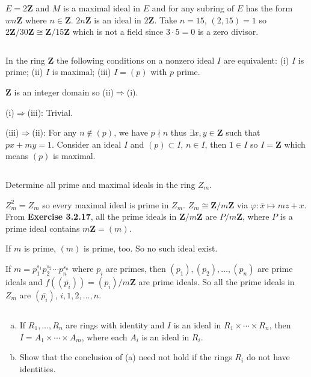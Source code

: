 \begin{answer}
    $E=2\mathbf{Z}$ and $M$ is a maximal ideal in $E$ and for any subring of $E$ has the form $wn\mathbf{Z}$ where $n\in \mathbf{Z}$. $2n\mathbf{Z}$ is an ideal in $2\mathbf{Z}$. Take $n=15$, $(2,15)=1$ so $2\mathbf{Z} /30\mathbf{Z}\cong \mathbf{Z} /15\mathbf{Z}$ which is not a field since $3\cdot 5=0$ is a zero divisor.
\end{answer}

$$ $$

\begin{ex}
    In the ring $\mathbf{Z}$ the following conditions on a nonzero ideal $I$ are equivalent: (i) $I$ is prime; (ii) $I$ is maximal; (iii) $I=(p)$ with $p$ prime.    
\end{ex}

\begin{answer}
    $\mathbf{Z}$ is an integer domain so (ii)$\Rightarrow$(i).

    (i)$\Rightarrow$(iii): Trivial.

    (iii)$\Rightarrow$(ii): For any $n\notin (p)$, we have $p\nmid n$ thus $\exists x,y\in \mathbf{Z}$ such that $px+my=1$. Consider an ideal $I$ and $(p)\subset I$, $n\in I$, then $1\in I$ so $I=\mathbf{Z}$ which means $(p)$ is maximal.
\end{answer}

$$ $$

\begin{ex}
    Determine all prime and maximal ideals in the ring $Z_{m}$.
\end{ex}

\begin{answer}
    $Z_{m}^{2}=Z_{m}$ so every maximal ideal is prime in $Z_{m}$. $Z_{m}\cong \mathbf{Z} /m\mathbf{Z}$ via $\varphi:\bar{x}\mapsto mz+x$. From \textbf{Exercise 3.2.17}, all the prime ideals in $\mathbf{Z}/m\mathbf{Z}$ are $P /m\mathbf{Z}$, where $P$ is a prime ideal contains $m\mathbf{Z}=(m)$.

    If $m$ is prime, $(m)$ is prime, too. So no such ideal exist.

    If $m=p_{1}^{s_{1}}p_{2}^{s_{2}}\cdots p_{n}^{s_{n}}$ where $p_{i}$ are primes, then $(p_{1}), (p_{2}),\dots, (p_{n})$ are prime ideals and $f((\bar{p_{i}}))=(p_{i})/m\mathbf{Z}$ are prime ideals. So all the prime ideals in $Z_{m}$ are $(\bar{p_{i}})$, $i,1,2,\dots,n$.
\end{answer}

$$ $$

\begin{ex}
    \begin{enumerate}[(a)]
        \item If $R_{1},\dots, R_{n}$ are rings with identity and $I$ is an ideal in $R_{1}\times \cdots\times R_{n}$, then $I=A_{1}\times \cdots\times A_{m}$, where each $A_{i}$ is an ideal in $R_{i}$.
        \item Show that the conclusion of (a) need not hold if the rings $R_{i}$ do not have identities.
    \end{enumerate}
\end{ex}

